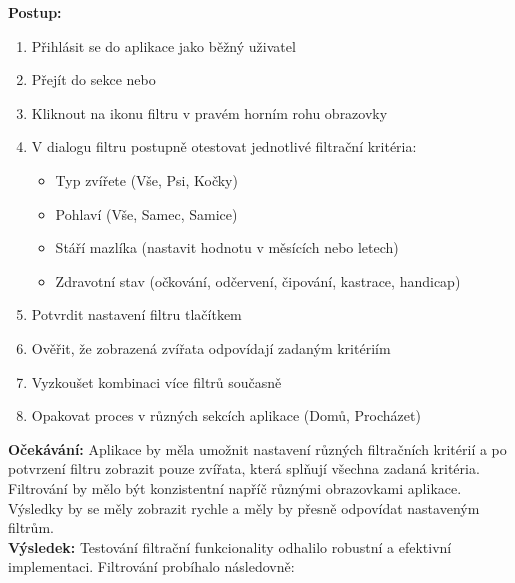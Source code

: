 \documentclass[czech, bp, kiv, he, iso690numb, pdf]{fasthesis}
\begin{document}
    \noindent \textbf{Postup:}
    \begin{enumerate}
        \item Přihlásit se do aplikace jako běžný uživatel
        \item Přejít do sekce  nebo 
        \item Kliknout na ikonu filtru v pravém horním rohu obrazovky
        \item V dialogu filtru postupně otestovat jednotlivé filtrační kritéria:
        \begin{itemize}
            \item Typ zvířete (Vše, Psi, Kočky)
            \item Pohlaví (Vše, Samec, Samice)
            \item Stáří mazlíka (nastavit hodnotu v měsících nebo letech)
            \item Zdravotní stav (očkování, odčervení, čipování, kastrace, handicap)
        \end{itemize}
        \item Potvrdit nastavení filtru tlačítkem 
        \item Ověřit, že zobrazená zvířata odpovídají zadaným kritériím
        \item Vyzkoušet kombinaci více filtrů současně
        \item Opakovat proces v různých sekcích aplikace (Domů, Procházet)
    \end{enumerate}

    \noindent \textbf{Očekávání:}
    Aplikace by měla umožnit nastavení různých filtračních kritérií a po potvrzení filtru zobrazit pouze zvířata, která splňují všechna zadaná kritéria. Filtrování by mělo být konzistentní napříč různými obrazovkami aplikace. Výsledky by se měly zobrazit rychle a měly by přesně odpovídat nastaveným filtrům.\\

    \noindent \textbf{Výsledek:}
    Testování filtrační funkcionality odhalilo robustní a efektivní implementaci. Filtrování probíhalo následovně:
\end{document}

